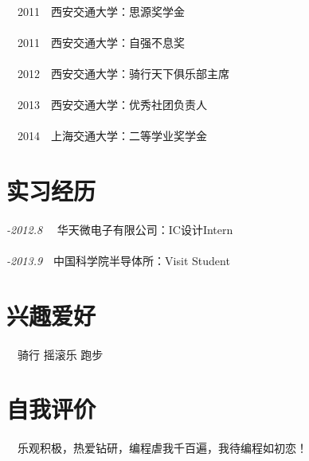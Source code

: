 \documentclass[12pt,a4paer]{article}
\begin{document}
\begin{CJK}{UTF8}{gbsn}
  \paragraph{}\textit{\textbullet}~~2011~~西安交通大学：思源奖学金 \vspace{-1.5em}
   \paragraph{}\textit{\textbullet}~~2011~~西安交通大学：自强不息奖\vspace{-1.5em}
    \paragraph{}\textit{\textbullet}~~2012~~西安交通大学：骑行天下俱乐部主席\vspace{-1.5em}
     \paragraph{}\textit{\textbullet}~~2013~~西安交通大学：优秀社团负责人\vspace{-1.5em}
      \paragraph{}\textit{\textbullet}~~2014~~上海交通大学：二等学业奖学金\vspace{-1.5em}        
\section*{{\large 实习经历}}
 \vspace{-1em}
  \paragraph{}\textit{-2012.8 }~~华天微电子有限公司：IC设计Intern\vspace{-1.5em}
   \paragraph{}\textit{-2013.9}~~中国科学院半导体所：Visit Student\vspace{-1.5em}
\section*{{\large 兴趣爱好}}
 \vspace{-0.8em}
  \paragraph{}\textit{\textbullet}~~骑行 摇滚乐 跑步\vspace{-1.5em}
\section*{{\large 自我评价}}
 \vspace{-1em}
  \paragraph{}\textit{\textbullet}~~乐观积极，热爱钻研，编程虐我千百遍，我待编程如初恋！\vspace{-1.5em}
\end{CJK}
\end{document}
